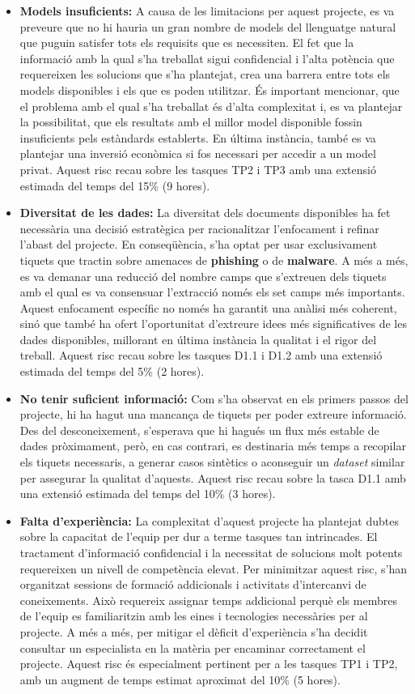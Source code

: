 \begin{itemize}
    \item \textbf{Models insuficients:} A causa de les limitacions per aquest projecte, es va preveure que no hi hauria un gran nombre de models del llenguatge natural que puguin satisfer tots els requisits que es necessiten. El fet que la informació amb la qual s'ha treballat sigui confidencial i l'alta potència que requereixen les solucions que s'ha plantejat, crea una barrera entre tots els models disponibles i els que es poden utilitzar. És important mencionar, que el problema amb el qual s'ha treballat és d'alta complexitat i, es va plantejar la possibilitat, que els resultats amb el millor model disponible fossin insuficients pels estàndards establerts. En última instància, també es va plantejar una inversió econòmica si fos necessari per accedir a un model privat. Aquest risc recau sobre les tasques TP2 i TP3 amb una extensió estimada del temps del 15\% (9 hores).
    \item \textbf{Diversitat de les dades:} La diversitat dels documents disponibles ha fet necessària una decisió estratègica per racionalitzar l'enfocament i refinar l'abast del projecte. En conseqüència, s'ha optat per usar exclusivament tiquets que tractin sobre amenaces de \textbf{phishing} o de \textbf{malware}. A més a més, es va demanar una reducció del nombre camps que s'extreuen dels tiquets amb el qual es va consensuar l'extracció només els set camps més importants. Aquest enfocament específic no només ha garantit una anàlisi més coherent, sinó que també ha ofert l'oportunitat d'extreure idees més significatives de les dades disponibles, millorant en última instància la qualitat i el rigor del treball. Aquest risc recau sobre les tasques D1.1 i D1.2 amb una extensió estimada del temps del 5\% (2 hores).
    \item \textbf{No tenir suficient informació:} Com s'ha observat en els primers passos del projecte, hi ha hagut una mancança de tiquets per poder extreure informació. Des del desconeixement, s'esperava que hi hagués un flux més estable de dades pròximament, però, en cas contrari, es destinaria més temps a recopilar els tiquets necessaris, a generar casos sintètics o aconseguir un \textit{dataset} similar per assegurar la qualitat d'aquests. Aquest risc recau sobre la tasca D1.1 amb una extensió estimada del temps del 10\% (3 hores).
    \item \textbf{Falta d'experiència:} La complexitat d'aquest projecte ha plantejat dubtes sobre la capacitat de l'equip per dur a terme tasques tan intrincades. El tractament d'informació confidencial i la necessitat de solucions molt potents requereixen un nivell de competència elevat. Per minimitzar aquest risc, s'han organitzat sessions de formació addicionals i activitats d'intercanvi de coneixements. Això requereix assignar temps addicional perquè els membres de l'equip es familiaritzin amb les eines i tecnologies necessàries per al projecte. A més a més, per mitigar el dèficit d'experiència s'ha decidit consultar un especialista en la matèria per encaminar correctament el projecte. Aquest risc és especialment pertinent per a les tasques TP1 i TP2, amb un augment de temps estimat aproximat del 10\% (5 hores).

\end{itemize}
